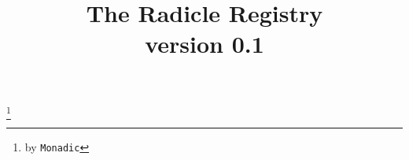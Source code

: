\documentclass[a4paper, oneside, 11pt, final]{amsart}
\begin{document}
\title[Radicle Registry]{The Radicle Registry \\ {\tiny version 0.1}}
\thanks{by \texttt{Monadic}}

\maketitle

\bigskip
\tableofcontents
\newpage


\end{document}
